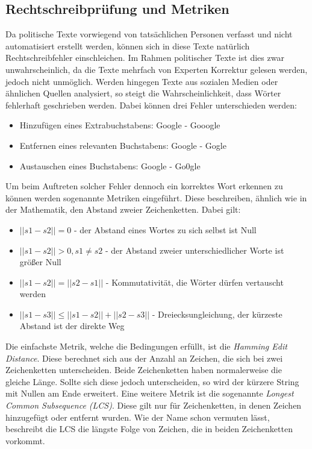 \subsection{Rechtschreibprüfung und Metriken}
Da politische Texte vorwiegend von tatsächlichen Personen verfasst und nicht automatisiert erstellt werden, können sich in diese Texte natürlich Rechtschreibfehler einschleichen. Im Rahmen politischer Texte ist dies zwar unwahrscheinlich, da die Texte mehrfach von Experten Korrektur gelesen werden, jedoch nicht unmöglich. Werden hingegen Texte aus sozialen Medien oder ähnlichen Quellen analysiert, so steigt die Wahrscheinlichkeit, dass Wörter fehlerhaft geschrieben werden. Dabei können drei Fehler unterschieden werden:
\begin{itemize}
\item Hinzufügen eines Extrabuchstabens: Google - Gooogle
\item Entfernen eines relevanten Buchstabens: Google - Gogle
\item Austauschen eines Buchstabens: Google - Go0gle
\end{itemize}
Um beim Auftreten solcher Fehler dennoch ein korrektes Wort erkennen zu können werden sogenannte Metriken eingeführt. Diese beschreiben, ähnlich wie in der Mathematik, den Abstand zweier Zeichenketten. Dabei gilt:
\begin{itemize}
\item \( ||s1 - s2|| = 0 \) - der Abstand eines Wortes zu sich selbst ist Null
\item \( ||s1 - s2|| > 0, s1 \neq s2 \) - der Abstand zweier unterschiedlicher Worte ist größer Null
\item \( ||s1 - s2|| = ||s2 - s1|| \) - Kommutativität, die Wörter dürfen vertauscht werden
\item \( ||s1 - s3|| \leq ||s1 - s2|| + ||s2 - s3|| \) - Dreiecksungleichung, der kürzeste Abstand ist der direkte Weg
\end{itemize}
Die einfachste Metrik, welche die Bedingungen erfüllt, ist die \textit{Hamming Edit Distance}. Diese berechnet sich aus der Anzahl an Zeichen, die sich bei zwei Zeichenketten unterscheiden. Beide Zeichenketten haben normalerweise die gleiche Länge. Sollte sich diese jedoch unterscheiden, so wird der kürzere String mit Nullen am Ende erweitert.
\newline
Eine weitere Metrik ist die sogenannte \textit{Longest Common Subsequence (LCS)}. Diese gilt nur für Zeichenketten, in denen Zeichen hinzugefügt oder entfernt wurden. Wie der Name schon vermuten lässt, beschreibt die LCS die längste Folge von Zeichen, die in beiden Zeichenketten vorkommt.
